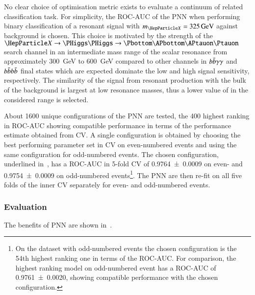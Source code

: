 No clear choice of optimisation metric exists to evaluate a continuum
of related classification task. For simplicity, the ROC-AUC of the PNN
when performing binary classification of a resonant signal with
$\mX = \SI{325}{\GeV}$ against background is chosen. This choice is
motivated by the strength of the $\PX \to \HH \to \bbtautau$ search
channel in an intermediate mass range of the scalar resonance from
approximately \SI{300}{\GeV} to \SI{600}{\GeV} compared to other
channels in $b\bar{b}\gamma\gamma$ and $b\bar{b}b\bar{b}$ final states which
are expected dominate the low and high \mX signal sensitivity,
respectively. The similarity of the \HH signal from resonant
production with the bulk of the background is largest at low resonance
masses, thus a lower value of \mX in the considered range is selected.

About 1600 unique configurations of the PNN are tested, the 400
highest ranking in ROC-AUC showing compatible performance in terms of
the performance estimate obtained from CV. A single configuration is
obtained by choosing the best performing parameter set in CV on
even-numbered events and using the same configuration for odd-numbered
events. The chosen configuration, underlined
in~, has a ROC-AUC in 5-fold CV of
\num{0.9764 +- 0.0009} on even- and \num{0.9754 +- 0.0009} on
odd-numbered events\footnote{On the dataset with odd-numbered events
  the chosen configuration is the 54th highest ranking one in terms of
  the ROC-AUC. For comparison, the highest ranking model on
  odd-numbered event has a ROC-AUC of \num{0.9761 +- 0.0020}, showing
  compatible performance with the chosen configuration.}. The PNN are
then re-fit on all five folds of the inner CV separately for even- and
odd-numbered events.

\subsubsection{Evaluation}

The benefits of PNN are shown in~.

